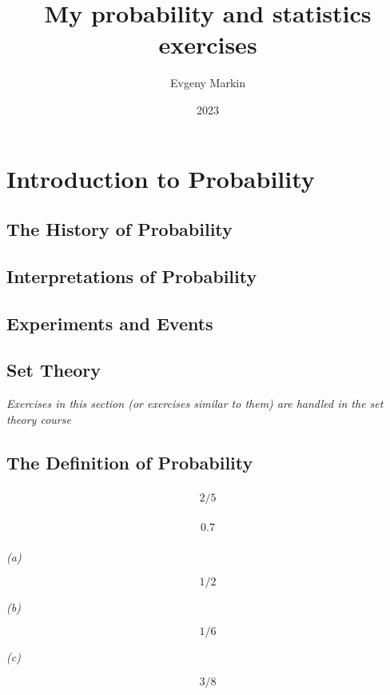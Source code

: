 \documentclass[11pt,oneside,titlepage]{book}
\title{My probability and statistics exercises}
\author{Evgeny Markin}
\date{2023}
\begin{document}
\maketitle
\tableofcontents

\chapter{Introduction to Probability}

\section{The History of Probability}

\section{Interpretations of Probability}

\section{Experiments and Events}

\section{Set Theory }

\textit{Exercises in this section (or exercises similar to them) are handled in the set theory
  course}

\section{The Definition of Probability}

\subsection{}

$$2/5$$

\subsection{}

$$0.7$$

\subsection{}

\textit{(a)}

$$1/2$$

\textit{(b)}

$$1/6$$

\textit{(c)}

$$3/8$$

\subsection{}
\end{document}
